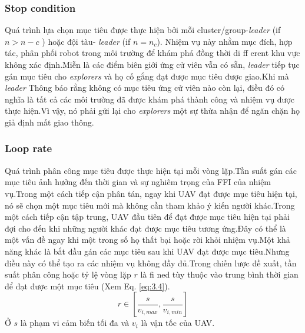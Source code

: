 \documentclass[11pt,openany]{book}
\begin{document}
\begin{algorimth}[H]
\subsubsection{Stop condition}
Quá trình lựa chọn mục tiêu được thực hiện bởi mỗi cluster/group-\textit{leader} (if $n>n-c$ ) hoặc đội tàu- \textit{leader} (if $n=n_c$). Nhiệm vụ này nhằm mục đích, hợp tác, phân phối robot trong môi trường để khám phá đồng thời di ff erent khu vực không xác định.Miễn là các điểm biên giới ứng cử viên vẫn có sẵn, \textit{leader} tiếp tục gán mục tiêu cho \textit{explorers} và họ cố gắng đạt được mục tiêu được giao.Khi mà \textit{leader} Thông báo rằng không có mục tiêu ứng cử viên nào còn lại, điều đó có nghĩa là tất cả các môi trường đã được khám phá thành công và nhiệm vụ được thực hiện.Vì vậy, nó phải gửi lại cho \textit{explorers} một sự thừa nhận để ngăn chặn họ giả định mất giao thông.
\subsubsection{Loop rate}
Quá trình phân công mục tiêu được thực hiện tại mỗi vòng lặp.Tần suất gán các mục tiêu ảnh hưởng đến thời gian và sự nghiêm trọng của FFI của nhiệm vụ.Trong một cách tiếp cận phân tán, ngay khi UAV đạt được mục tiêu hiện tại, nó sẽ chọn một mục tiêu mới mà không cần tham khảo ý kiến người khác.Trong một cách tiếp cận tập trung, UAV đầu tiên để đạt được mục tiêu hiện tại phải đợi cho đến khi những người khác đạt được mục tiêu tương ứng.Đây có thể là một vấn đề ngay khi một trong số họ thất bại hoặc rời khỏi nhiệm vụ.Một khả năng khác là bắt đầu gán các mục tiêu sau khi UAV đạt được mục tiêu.Nhưng điều này có thể tạo ra các nhiệm vụ không đầy đủ.Trong chiến lược đề xuất, tần suất phân công hoặc tỷ lệ vòng lặp $r$ là fi ned tùy thuộc vào trung bình thời gian để đạt được một mục tiêu (Xem Eq. \ref{eq:3.4}).
\begin{equation} \label{eq:3.4}
    r \in [\frac{s}{v_{i,max}},\frac{s}{v_{i,min}}]
\end{equation}
Ở $s$ là phạm vi cảm biến tối đa và $v_i$ là vận tốc của UAV.

\end{algorimth}
\end{document}
